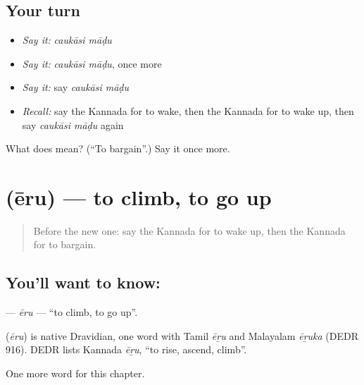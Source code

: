 \subsection*{Your turn}
\begin{itemize}
\raggedright
  \item \emph{Say it:} \emph{caukāsi māḍu}
  \item \emph{Say it:} \emph{caukāsi māḍu}, once more
  \item \emph{Say it:} say \emph{caukāsi māḍu}
  \item \emph{Recall:} say the Kannada for to wake, then the Kannada for to wake up, then say \emph{caukāsi māḍu} again
\end{itemize}

\begin{tcolorbox}[breakable,colback=teal!4,colframe=teal!35!black,title={Before you move on}]
What does   mean? (\textquotedblleft{}To bargain\textquotedblright{}.) Say it once more.
\end{tcolorbox}
\section[\texorpdfstring{\kn{ಏರು} (ēru)}{ಏರು (ēru)}]{ (ēru) — to climb, to go up}

\label{lesson:KA-C236-eru}



\begin{quote}
Before the new one: say the Kannada for to wake up, then the Kannada for to bargain.
\end{quote}

\subsection*{You'll want to know: }
\textbf{} — \emph{ēru} — \textquotedblleft{}to climb, to go up\textquotedblright{}.

\begin{cousinweb}
\textbf{} (\emph{ēru}) is native Dravidian, one word with Tamil \emph{ēṟu} and Malayalam \emph{ēṟuka} (DEDR 916). DEDR lists Kannada \emph{ēṟu}, \textquotedblleft{}to rise, ascend, climb\textquotedblright{}.
\end{cousinweb}

\begin{grammarlens}[title={What you've built}]
One more word for this chapter.
\end{grammarlens}

